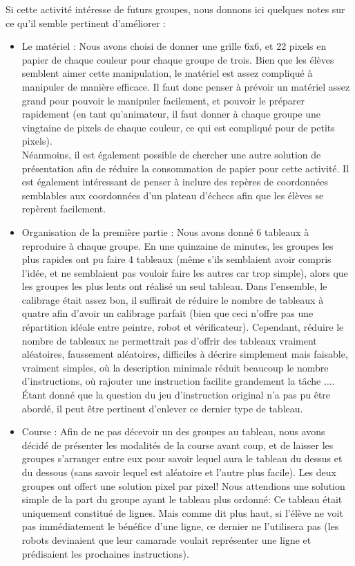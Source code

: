 \documentclass{article}
\begin{document}
Si cette activité intéresse de futurs groupes, nous donnons ici quelques notes sur ce qu'il semble pertinent d'améliorer : 
\begin{itemize}
\item Le matériel : Nous avons choisi de donner une grille 6x6, et 22 pixels en papier de chaque couleur pour chaque groupe de trois. Bien que les élèves semblent aimer cette manipulation, le matériel est assez compliqué à manipuler de manière efficace. Il faut donc penser à prévoir un matériel assez grand pour pouvoir le manipuler facilement, et pouvoir le préparer rapidement (en tant qu'animateur, il faut donner à chaque groupe une vingtaine de pixels de chaque couleur, ce qui est compliqué pour de petits pixels).\\
Néanmoins, il est également possible de chercher une autre solution de présentation afin de réduire la consommation de papier pour cette activité. Il est également intéressant de penser à inclure des repères de coordonnées semblables aux coordonnées d'un plateau d'échecs afin que les élèves se repèrent facilement.

\item Organisation de la première partie : Nous avons donné 6 tableaux à reproduire à chaque groupe. En une quinzaine de minutes, les groupes les plus rapides ont pu faire 4 tableaux (même s'ils semblaient avoir compris l'idée, et ne semblaient pas vouloir faire les autres car trop simple), alors que les groupes les plus lents ont réalisé un seul tableau. Dans l'ensemble, le calibrage était assez bon, il suffirait de réduire le nombre de tableaux à quatre afin d'avoir un calibrage parfait (bien que ceci n'offre pas une répartition idéale entre peintre, robot et vérificateur). Cependant, réduire le nombre de tableaux ne permettrait pas d'offrir des tableaux vraiment aléatoires, faussement aléatoires, difficiles à décrire simplement mais faisable, vraiment simples, où la description minimale réduit beaucoup le nombre d'instructions, où rajouter une instruction facilite grandement la tâche $\ldots$. Étant donné que la question du jeu d'instruction original n'a pas pu être abordé, il peut être pertinent d'enlever ce dernier type de tableau.

\item Course : Afin de ne pas décevoir un des groupes au tableau, nous avons décidé de présenter les modalités de la course avant coup, et de laisser les groupes s'arranger entre eux pour savoir lequel aura le tableau du dessus et du dessous (sans savoir lequel est aléatoire et l'autre plus facile). Les deux groupes ont offert une solution pixel par pixel! Nous attendions une solution simple de la part du groupe ayant le tableau plus ordonné: Ce tableau était uniquement constitué de lignes. Mais comme dit plus haut, si l'élève ne voit pas immédiatement le bénéfice d'une ligne, ce dernier ne l'utilisera pas (les robots devinaient que leur camarade voulait représenter une ligne et prédisaient les prochaines instructions).


\end{itemize}
\end{document}
